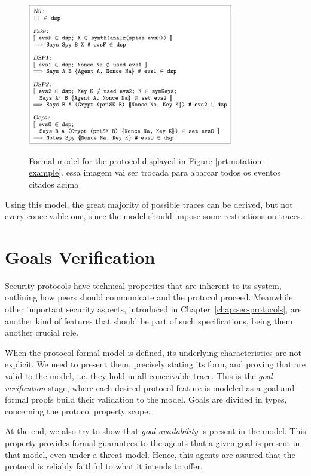 \begin{figure}
  \centering
  \includegraphics[width=0.8\textwidth]{img/prt-example-model}
  \label{fig:notation-example-model}
  \caption{Formal model for the protocol displayed in Figure \ref{prt:notation-example}. {\color{blue} essa imagem vai ser trocada para abarcar todos os eventos citados acima}}
\end{figure}

Using this model, the great majority of possible traces can be derived, but not every conceivable one, since the model should impose some restrictions on traces.





\section{Goals Verification}
Security protocols have technical properties that are inherent to its system, outlining how peers should communicate and the protocol proceed. Meanwhile, other important security aspects, introduced in Chapter~\ref{chap:sec-protocols}, are another kind of features that should be part of such specifications, being them another crucial role.

When the protocol formal model is defined, its underlying characteristics are not explicit. We need to present them, precisely stating its form, and proving that are valid to the model, i.e. they hold in all conceivable trace. This is the \textit{goal verification} stage, where each desired protocol feature is modeled as a goal and formal proofs build their validation to the model. Goals are divided in types, concerning the protocol property scope.

At the end, we also try to show that \textit{goal availability} is present in the model. This property provides formal guarantees to the agents that a given goal is present in that model, even under a threat model. Hence, this agents are assured that the protocol is reliably faithful to what it intends to offer.



